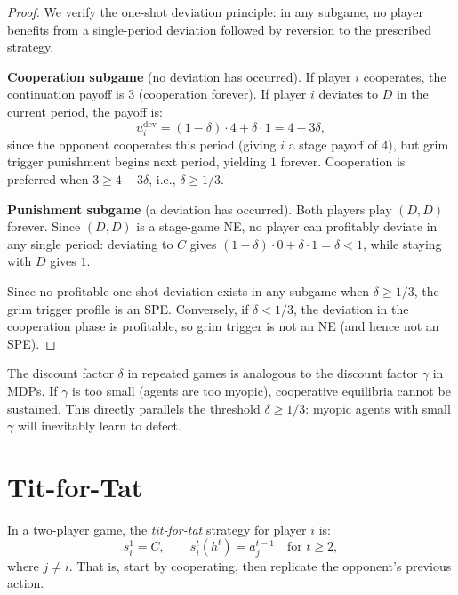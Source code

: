 \documentclass[11pt,a4paper]{article}
\begin{document}
\begin{proof}
We verify the one-shot deviation principle: in any subgame, no player
benefits from a single-period deviation followed by reversion to the
prescribed strategy.

\textbf{Cooperation subgame} (no deviation has occurred). If player $i$
cooperates, the continuation payoff is $3$ (cooperation forever). If
player $i$ deviates to $D$ in the current period, the payoff is:
\[
    u_i^{\mathrm{dev}} = (1-\delta) \cdot 4 + \delta \cdot 1
    = 4 - 3\delta,
\]
since the opponent cooperates this period (giving $i$ a stage payoff of
$4$), but grim trigger punishment begins next period, yielding $1$ forever.
Cooperation is preferred when $3 \geq 4 - 3\delta$, i.e.,
$\delta \geq 1/3$.

\textbf{Punishment subgame} (a deviation has occurred). Both players play
$(D,D)$ forever. Since $(D,D)$ is a stage-game NE, no player can
profitably deviate in any single period: deviating to $C$ gives
$(1-\delta) \cdot 0 + \delta \cdot 1 = \delta < 1$, while staying with
$D$ gives $1$.

Since no profitable one-shot deviation exists in any subgame when
$\delta \geq 1/3$, the grim trigger profile is an SPE. Conversely, if
$\delta < 1/3$, the deviation in the cooperation phase is profitable, so
grim trigger is not an NE (and hence not an SPE).
\end{proof}

\begin{rlconnection}[title={Discount Factors in RL}]
The discount factor $\delta$ in repeated games is analogous to the discount
factor $\gamma$ in MDPs. If $\gamma$ is too small (agents are too myopic),
cooperative equilibria cannot be sustained. This directly parallels the
threshold $\delta \geq 1/3$: myopic agents with small $\gamma$ will
inevitably learn to defect.
\end{rlconnection}


\section{Tit-for-Tat}
\label{sec:tit-for-tat}

\begin{definition}
\label{def:tit-for-tat}
In a two-player game, the \emph{tit-for-tat} strategy for player $i$ is:
\[
    s_i^1 = C, \qquad s_i^t(h^t) = a_j^{t-1} \quad \text{for } t \geq 2,
\]
where $j \neq i$. That is, start by cooperating, then replicate the
opponent's previous action.
\end{definition}
\end{document}
